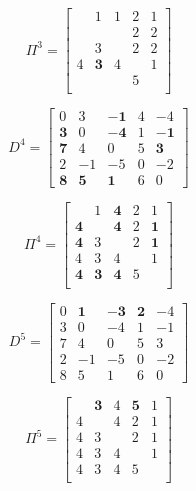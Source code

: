 			\begin{equation}
				\Pi^3 = \begin{bmatrix}
					& 1 & 1 & 2 & 1 \\
					& & & 2 & 2\\
					& 3 & & 2 & 2 \\
					4 & \mathbf{3} & 4 & & 1\\
					& & & 5 & \\
				\end{bmatrix}
			\end{equation}

			\begin{equation}
				D^4 = \begin{bmatrix}
					0 & 3 & \mathbf{-1} & 4 & -4 \\
					\mathbf{3} & 0  &\mathbf{-4} & 1 & \mathbf{-1} \\
					\mathbf{7} & 4 & 0 & 5 & \mathbf{3}\\
					2 & -1 & -5 & 0 &-2\\
					\mathbf{8} & \mathbf{5} & \mathbf{1} & 6 & 0
				\end{bmatrix}
			\end{equation}

			\begin{equation}
				\Pi^4 = \begin{bmatrix}
					& 1 & \mathbf{4} & 2 & 1 \\
					\mathbf{4} & & \mathbf{4} & 2 & \mathbf{1}\\
					\mathbf{4} & 3 & & 2 & \mathbf{1} \\
					4 & 3 & 4 & & 1\\
					\mathbf{4} & \mathbf{3} & \mathbf{4} & 5 & \\
				\end{bmatrix}
			\end{equation}

			\begin{equation}
				D^5 = \begin{bmatrix}
					0 & \mathbf{1} & \mathbf{-3} & \mathbf{2} & -4 \\
					3 & 0  & -4 & 1 & -1 \\
					7 & 4 & 0 & 5 & 3\\
					2 & -1 & -5 & 0 &-2\\
					8 & 5 & 1 & 6 & 0
				\end{bmatrix}
			\end{equation}

			\begin{equation}
				\Pi^5 = \begin{bmatrix}
					& \mathbf{3} & 4 & \mathbf{5} & 1 \\
					4 & & 4 & 2 & 1\\
					4 & 3 & & 2 & 1 \\
					4 & 3 & 4 & & 1\\
					4 & 3 & 4 & 5 & \\
				\end{bmatrix}
			\end{equation}

